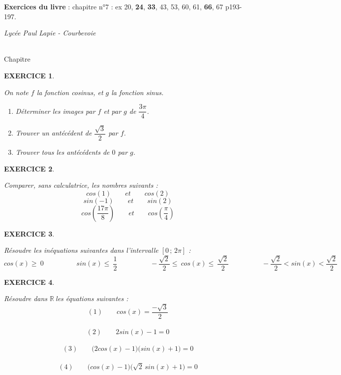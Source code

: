 \documentclass[a4paper]{article}   %
\renewcommand{\(}{\left(}
\renewcommand{\)}{\right)}
\newtheorem{EXO}{\large EXERCICE }
\newenvironment{EX}   { \setcounter{ques}{0} \begin{EXO} \hrulefill ~\vspace{0.3cm}

\normalfont}    {\end{EXO} \medskip}
\newcommand{\R}{ ${\mathbb R} ~$}
\newcommand{\ie}{\leqslant ~}  		%
\newcommand{\se}{\geqslant~} 		%
\newcommand{\f}{\dfrac} 	%
\def\cl{{\large \bf{1èreG1}}}
\begin{document}
\textbf{Exercices du livre }: chapitre n°7 : ex 20, \textbf{24}, \textbf{33}, 43, 53, 60, 61, \textbf{66}, 67 p193-197.


\newpage
\noindent\begin{minipage}{.20\linewidth}\begin{center}                  
\noindent \emph{Lycée Paul Lapie - Courbevoie}
\end{center}\end{minipage}
\begin{minipage}{1.5\linewidth}\begin{center}	
\noindent \cl\\ Chapitre \numero
\end{center}\end{minipage}

\begin{center} 	
\end{center}

\begin{EX} On note $f$ la fonction cosinus, et $g$ la fonction sinus. \begin{enumerate}
\item Déterminer les images par $f$ et par $g$ de $\f{3\pi}{4}$.
\item Trouver un antécédent de $\f{\sqrt3}{2}$ par $f$.
\item Trouver tous les antécédents de $0$ par $g$.
\end{enumerate}
\end{EX}



\begin{EX} 
Comparer, sans calculatrice, les nombres suivants : $$cos(1) \qquad et \qquad cos(2)$$
$$sin(-1) \qquad et \qquad sin(2)$$
$$ cos(\f{17\pi}{8}) \qquad et \qquad cos(\f{\pi}{4})$$
\end{EX}



\begin{EX} 
Résoudre les inéquations suivantes dans l'intervalle $[0\,;\,2\pi]$ :
$$cos(x)\se 0 \hspace{2cm} sin(x)\ie \f{1}{2}  \hspace{2cm} -\f{\sqrt2}{2}\ie cos(x)\ie \f{\sqrt2}{2} \hspace{2cm} -\f{\sqrt2}{2} < sin(x) < \f{\sqrt2}{2} $$
\end{EX}



\begin{EX} 
Résoudre dans \R les équations suivantes : 
$$(1) \qquad cos(x)=\f{-\sqrt3}{2}$$
~~
$$(2) \qquad 2sin(x)-1=0$$
~~
$$(3) \qquad \big( 2cos(x)-1 \big) \big( sin(x)+1 \big) =0$$
~~
$$(4) \qquad \big( cos(x)-1 \big) \big( \sqrt2\,sin(x)+1 \big) =0$$
\end{EX}
\end{document}
